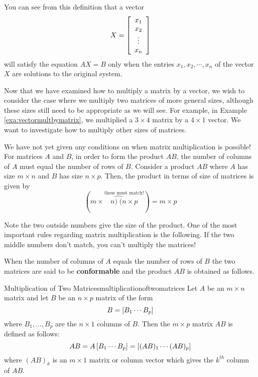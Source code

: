 You can see from this definition that a vector 
\begin{equation*}
X =
\left[
\begin{array}{c}
x_{1} \\
x_{2} \\
\vdots \\
x_{n}
\end{array}
\right]
\end{equation*}
will satisfy the equation $AX=B$
only when the entries $x_{1}, x_{2}, \cdots, x_{n}$ of the vector $X$ are solutions to the original system.

Now that we have examined how to multiply a matrix by a vector, we
wish to consider the case where we multiply two matrices of more
general sizes, although these sizes still need to be appropriate as we
will see. For example, in Example \ref{exa:vectormultbymatrix}, we
multiplied a $3 \times 4$ matrix by a $4 \times 1$ vector.  We want to
investigate how to multiply other sizes of matrices.

We have not yet given any conditions on when matrix multiplication is
possible!  For matrices $A$ and $B$, in order to form the product
$AB$, the number of columns of $A$ must equal the number of rows of
$B.$ Consider a product $AB$ where $A$ has size $m\times n$ and $B$
has size $n \times p$. Then, the product in terms of size of matrices
is given by
\begin{equation*}
(m\times\overset{\text{these must match!}}{\widehat{n)\;(n}\times p})=m\times p
\end{equation*}

Note the two outside numbers give the size of the product. One of the most important rules regarding matrix multiplication is the following. 
If the two middle numbers don't match, you can't multiply the
matrices!

When the number of columns of $A$ equals the number of rows
of $B$ the two matrices are said to be \textbf{conformable}
 and the product $AB$ is obtained
 as follows.

\begin{definition}{Multiplication of Two Matrices}{multiplicationoftwomatrices}
 Let $A$ be an $m\times n$ matrix
and let $B$ be an $n\times p$ matrix of the form
\begin{equation*}
B=\left[ B_{1} \cdots  B_{p}\right]
\end{equation*}
where $B_{1},...,B_{p}$ are the $n\times 1$ columns of $B$. Then the 
$m\times p$ matrix $AB$ is defined as follows:
\begin{equation*}
AB = A \left[ B_{1} \cdots  B_{p}\right] =  \left[ (A B)_{1} \cdots  (AB)_{p}\right] 
\end{equation*}
where $(AB)_{k}$ is an $m\times 1$ matrix or column vector which
gives the $k^{th}$ column of $AB$. 
\end{definition}

